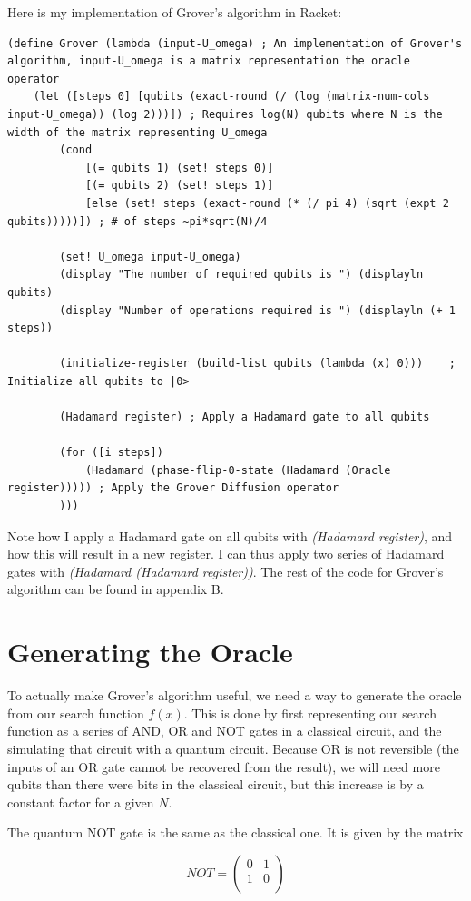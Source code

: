 \documentclass[11pt]{report}
\newcommand{\?}{\stackrel{?}{=}}
\begin{document}
Here is my implementation of Grover's algorithm in Racket:

\begin{lstlisting}
(define Grover (lambda (input-U_omega) ; An implementation of Grover's algorithm, input-U_omega is a matrix representation the oracle operator
	(let ([steps 0] [qubits (exact-round (/ (log (matrix-num-cols input-U_omega)) (log 2)))]) ; Requires log(N) qubits where N is the width of the matrix representing U_omega
		(cond
			[(= qubits 1) (set! steps 0)]
			[(= qubits 2) (set! steps 1)]
			[else (set! steps (exact-round (* (/ pi 4) (sqrt (expt 2 qubits)))))]) ; # of steps ~pi*sqrt(N)/4

		(set! U_omega input-U_omega)
		(display "The number of required qubits is ") (displayln qubits)
		(display "Number of operations required is ") (displayln (+ 1 steps))

		(initialize-register (build-list qubits (lambda (x) 0)))	; Initialize all qubits to |0>

		(Hadamard register)	; Apply a Hadamard gate to all qubits

		(for ([i steps])
			(Hadamard (phase-flip-0-state (Hadamard (Oracle register))))) ; Apply the Grover Diffusion operator
		)))
\end{lstlisting}

Note how I apply a Hadamard gate on all qubits with \textit{(Hadamard register)}, and how this will result in a new register. I can thus apply two series of Hadamard gates with \textit{(Hadamard (Hadamard register))}. The rest of the code for Grover's algorithm can be found in appendix B.

\section{Generating the Oracle}

To actually make Grover's algorithm useful, we need a way to generate the oracle from our search function $f(x)$. This is done by first representing our search function as a series of AND, OR and NOT gates in a classical circuit, and the simulating that circuit with a quantum circuit. Because OR is not reversible (the inputs of an OR gate cannot be recovered from the result), we will need more qubits than there were bits in the classical circuit, but this increase is by a constant factor for a given $N$.

The quantum NOT gate is the same as the classical one. It is given by the matrix

$$NOT= \begin{pmatrix}
0 & 1 \\
1 & 0 \\
\end{pmatrix}$$
\end{document}
